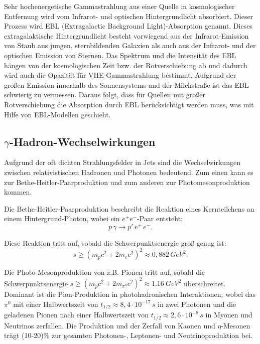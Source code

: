 Sehr hochenergetische Gammastrahlung aus einer Quelle in kosmologischer Entfernung wird vom Infrarot- und optischen Hintergrundlicht absorbiert. 
Dieser Prozess wird EBL (Extragalactic Background Light)-Absorption genannt. 
Dieses extragalaktische Hintergrundlicht besteht vorwiegend aus der Infrarot-Emission von Staub aus jungen, sternbildenden Galaxien als auch aus der Infrarot- und der optischen Emission von Sternen.
Das Spektrum und die Intensität des EBL hängen von der kosmologischen Zeit bzw. der Rotverschiebung ab und dadurch wird auch die Opazität für VHE-Gammastrahlung bestimmt.
Aufgrund der großen Emission innerhalb des Sonnensystems und der Milchstraße ist das EBL schwierig zu vermessen.
Daraus folgt, dass für Quellen mit großer Rotverschiebung die Absorption durch EBL berücksichtigt werden muss, was mit Hilfe von EBL-Modellen geschieht.\cite{RelativisticJets}


\subsection{$\gamma$-Hadron-Wechselwirkungen}
Aufgrund der oft dichten Strahlungsfelder in Jets sind die Wechselwirkungen zwischen relativistischen Hadronen und Photonen bedeutend.
Zum einen kann es zur Bethe-Heitler-Paarproduktion und zum anderen zur Photomesonproduktion kommen.\cite{RelativisticJets}

Die Bethe-Heitler-Paarproduktion beschreibt die Reaktion eines Kernteilchens an einem Hintergrund-Photon, wobei ein $e^+e^-$-Paar entsteht:
\begin{equation}
 p \, \gamma \rightarrow p' \, e^+ \, e^-.
\end{equation}

Diese Reaktion tritt auf, sobald die Schwerpunktsenergie groß genug ist:
\begin{equation}
 s \geq (m_p c^2 +2 m_e c^2)^2 \approx 0,882\, \si{GeV^2}.
\end{equation}

Die Photo-Mesonproduktion von z.B. Pionen tritt auf, sobald die Schwerpunktsenergie $s \geq (m_p c^2 +2 m_{\pi^0} c^2)^2 \approx \SI{1,16}{GeV^2}$ überschreitet.
Dominant ist die Pion-Produktion in photohadronischen Interaktionen, wobei das $\pi^0$ mit einer Halbwertszeit von $t_{1/2}\approx 8,4\cdot 10^{-17}\,\si{s}$ in zwei Photonen und die geladenen Pionen nach einer Halbwertszeit von $t_{1/2}\approx 2,6\cdot 10^{-8}\,\si{s}$ in Myonen und Neutrinos zerfallen.
Die Produktion und der Zerfall von Kaonen und $\eta$-Mesonen trägt (10-20)\% zur gesamten Photonen-, Leptonen- und Neutrinoproduktion bei.\cite{RelativisticJets}

